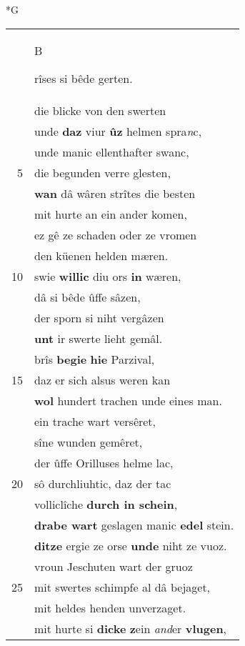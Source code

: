 \documentclass[8pt,a4paper,notitlepage]{article}
\begin{document}
\newpage
\begin{table}[ht]
\begin{minipage}[t]{0.5\linewidth}
\small
\begin{center}*G
\end{center}
\begin{tabular}{rl}
 & \begin{large}B\end{large}rîses si bêde gerten.\\ 
 & die blicke von den swerten\\ 
 & unde \textbf{daz} viur \textbf{ûz} helmen spra\textit{n}c,\\ 
 & unde manic ellenthafter swanc,\\ 
5 & die begunden verre glesten,\\ 
 & \textbf{wan} dâ wâren strîtes die besten\\ 
 & mit hurte an ein ander komen,\\ 
 & ez gê ze schaden oder ze vromen\\ 
 & den küenen helden mæren.\\ 
10 & swie \textbf{willic} diu ors \textbf{in} wæren,\\ 
 & dâ si bêde ûffe sâzen,\\ 
 & der sporn si niht vergâzen\\ 
 & \textbf{unt} ir swerte lieht gemâl.\\ 
 & brîs \textbf{begie} \textbf{hie} Parzival,\\ 
15 & daz er sich alsus weren kan\\ 
 & \textbf{wol} hundert trachen unde eines man.\\ 
 & ein trache wart versêret,\\ 
 & sîne wunden gemêret,\\ 
 & der ûffe Orilluses helme lac,\\ 
20 & sô durchliuhtic, daz der tac\\ 
 & volliclîche \textbf{durch in schein},\\ 
 & \textbf{drabe wart} geslagen manic \textbf{edel} stein.\\ 
 & \textbf{ditze} ergie ze orse \textbf{unde} niht ze vuoz.\\ 
 & vroun Jeschuten wart der gruoz\\ 
25 & mit swertes schimpfe al dâ bejaget,\\ 
 & mit heldes henden unverzaget.\\ 
 & mit hurte si \textbf{dicke} \textbf{z}ein \textit{and}er \textbf{vlugen},\\ 

\end{tabular}
\end{minipage}
\end{table}
\end{document}
